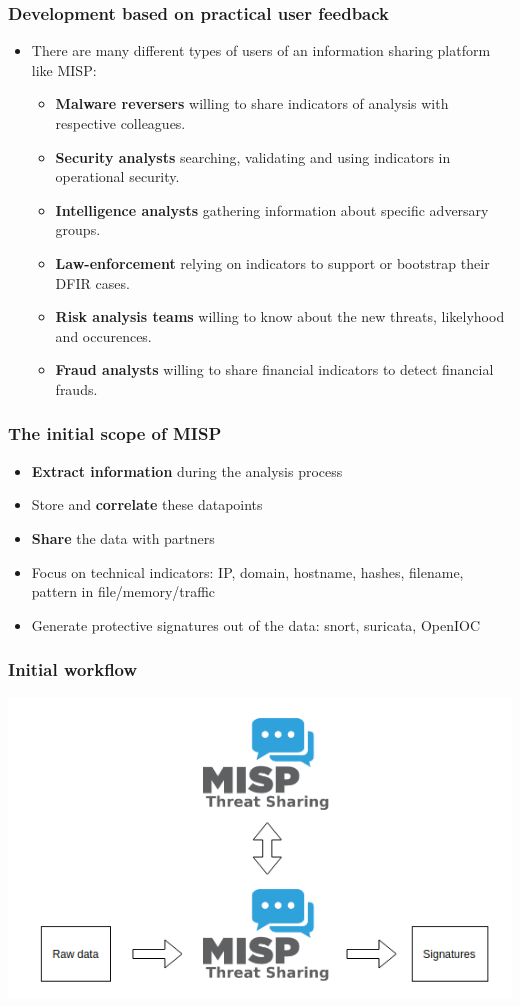 \begin{frame}
  \frametitle{Development based on practical user feedback}
  \begin{itemize}
    \item There are many different types of users of an information sharing platform like MISP:
    \begin{itemize}
      \item {\bf Malware reversers} willing to share indicators of analysis with respective colleagues.
      \item {\bf Security analysts} searching, validating and using indicators in operational security.
      \item {\bf Intelligence analysts} gathering information about specific adversary groups.
      \item {\bf Law-enforcement} relying on indicators to support or bootstrap their DFIR cases.
      \item {\bf Risk analysis teams} willing to know about the new threats, likelyhood and occurences.
      \item {\bf Fraud analysts} willing to share financial indicators to detect financial frauds.
    \end{itemize}
  \end{itemize}
\end{frame}

\begin{frame}
  \frametitle{The initial scope of MISP}
  \begin{itemize}
    \item {\bf Extract information} during the analysis process
    \item Store and {\bf correlate} these datapoints
    \item {\bf Share} the data with partners
    \item Focus on technical indicators: IP, domain, hostname, hashes, filename, pattern in file/memory/traffic
    \item Generate protective signatures out of the data: snort, suricata, OpenIOC
  \end{itemize}
\end{frame}

\begin{frame}
  \frametitle{Initial workflow}
  \begin{center}
    \includegraphics[scale=0.4]{workflow_initial.png}
  \end{center}
\end{frame}

